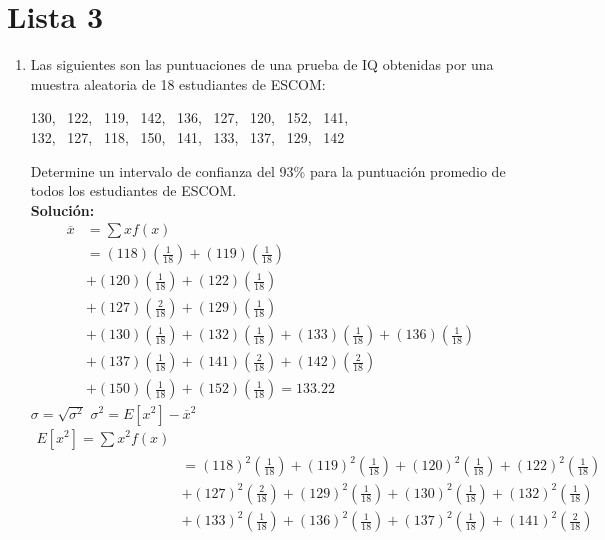 \section{Lista 3}
\begin{enumerate}
    \item Las siguientes son las puntuaciones de una prueba de IQ obtenidas por una muestra aleatoria de 18 estudiantes de ESCOM: 
    \begin{center} 130, \ 122, \ 119, \ 142, \ 136, \ 127, \ 120, \ 152, \ 141, \\
        132, \ 127, \ 118, \ 150, \ 141, \ 133, \ 137, \ 129, \ 142
    \end{center}
    Determine un intervalo de confianza del 93\% para la puntuación promedio de todos los estudiantes de ESCOM. \\ 
    \textbf{Solución: }
    \begin{align*}
         \overline{x} &= \sum xf(x)\\
         &= (118)\left( \frac{1}{18} \right) + (119)\left( \frac{1}{18} \right) \\
         &+ (120)\left( \frac{1}{18} \right) + (122)\left( \frac{1}{18} \right) \\
         &+ (127)\left( \frac{2}{18} \right) +  (129)\left( \frac{1}{18} \right) \\
         &+  (130)\left( \frac{1}{18} \right) + (132)\left( \frac{1}{18} \right) + (133)\left( \frac{1}{18} \right) + (136)\left( \frac{1}{18} \right) \\
         &+ (137)\left( \frac{1}{18} \right) + (141)\left( \frac{2}{18} \right) + (142)\left( \frac{2}{18} \right) \\
         &+   (150)\left( \frac{1}{18} \right) + (152)\left( \frac{1}{18} \right)  = 133.22
        \end{align*}
        $\sigma = \sqrt{\sigma^2}$
        $\sigma^2 = E[x^2] - \overline{x}^2$
    \begin{align*}     
        E[x^2] = \sum x^2 f(x)\\
        &= (118)^2\left( \frac{1}{18} \right) + (119)^2\left( \frac{1}{18} \right) + (120)^2\left( \frac{1}{18} \right) + (122)^2\left( \frac{1}{18} \right) \\
        &+ (127)^2\left( \frac{2}{18} \right) +   (129)^2\left( \frac{1}{18} \right) + (130)^2\left( \frac{1}{18} \right) + (132)^2\left( \frac{1}{18} \right) \\
        &+ (133)^2\left( \frac{1}{18} \right) + (136)^2\left( \frac{1}{18} \right) + (137)^2\left( \frac{1}{18} \right) + (141)^2\left( \frac{2}{18} \right) \\

\end{align*}
\end{enumerate}
